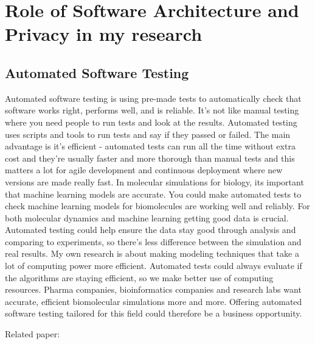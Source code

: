 \documentclass[11pt,a4paper]{article}
\begin{document}
\section{Role of Software Architecture and Privacy in my research}

\subsection{Automated Software Testing}

Automated software testing is using pre-made tests to automatically check that software works right, performs well, and is reliable.  It's not like manual testing where you need people to run tests and look at the results.  Automated testing uses scripts and tools to run tests and say if they passed or failed.  The main advantage is it's efficient - automated tests can run all the time without extra cost and they're usually faster and more thorough than manual tests and  this matters a lot for agile development and continuous deployment where new versions are made really fast.  In molecular simulations for biology, its important that machine learning models are accurate.  You could make automated tests to check machine learning models for biomolecules are working well and reliably.  For both molecular dynamics and machine learning getting good data is crucial.  Automated testing could help ensure the data stay good through analysis and comparing to experiments, so there's less difference between the simulation and real results.  My own research is about making modeling techniques that take a lot of computing power more efficient.  Automated tests could always evaluate if the algorithms are staying efficient, so we make better use of computing resources.  Pharma companies, bioinformatics companies and research labs want accurate, efficient biomolecular simulations more and more. Offering automated software testing tailored for this field could therefore be a business opportunity.


Related paper:\\
\noindent{}
\end{document}
